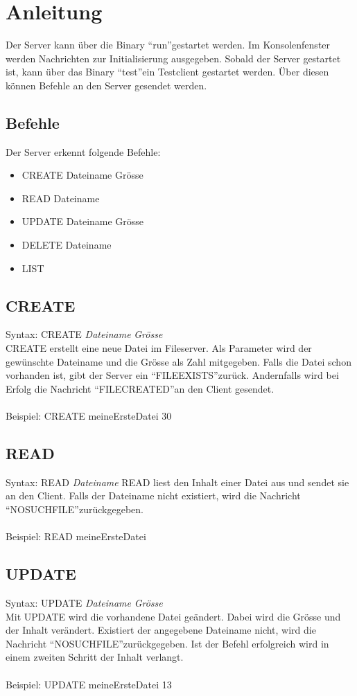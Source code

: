 \documentclass[12pt,a4paper,ngerman]{report}
\begin{document}
\chapter{Anleitung}
Der Server kann über die Binary \textquotedblleft run\textquotedblright gestartet werden. Im Konsolenfenster werden Nachrichten zur Initialisierung ausgegeben. Sobald der Server gestartet ist, kann über das Binary \textquotedblleft test\textquotedblright ein Testclient gestartet werden. Über diesen können Befehle an den Server gesendet werden.
\section{Befehle}
Der Server erkennt folgende Befehle:
\begin{itemize}
	\item CREATE Dateiname Grösse
	\item READ Dateiname
	\item UPDATE Dateiname Grösse
	\item DELETE Dateiname
	\item LIST
\end{itemize}

\section{CREATE}
Syntax: CREATE \textit{Dateiname} \textit{Grösse} \\
CREATE erstellt eine neue Datei im Fileserver. Als Parameter wird der gewünschte Dateiname und die Grösse als Zahl mitgegeben. Falls die Datei schon vorhanden ist, gibt der Server ein \textquotedblleft FILEEXISTS\textquotedblright zurück. Andernfalls wird bei Erfolg die Nachricht \textquotedblleft FILECREATED\textquotedblright an den Client gesendet.\\
\\
Beispiel: CREATE meineErsteDatei 30
\section{READ}
Syntax: READ \textit{Dateiname}
READ liest den Inhalt einer Datei aus und sendet sie an den Client. Falls der Dateiname nicht existiert, wird die Nachricht \textquotedblleft NOSUCHFILE\textquotedblright zurückgegeben.\\
\\
Beispiel: READ meineErsteDatei
\section{UPDATE}
Syntax: UPDATE \textit{Dateiname} \textit{Grösse}\\
Mit UPDATE wird die vorhandene Datei geändert. Dabei wird die Grösse und der Inhalt verändert. Existiert der angegebene Dateiname nicht, wird die Nachricht \textquotedblleft NOSUCHFILE\textquotedblright zurückgegeben. Ist der Befehl erfolgreich wird in einem zweiten Schritt der Inhalt verlangt.\\
\\
Beispiel: UPDATE meineErsteDatei 13
\end{document}
